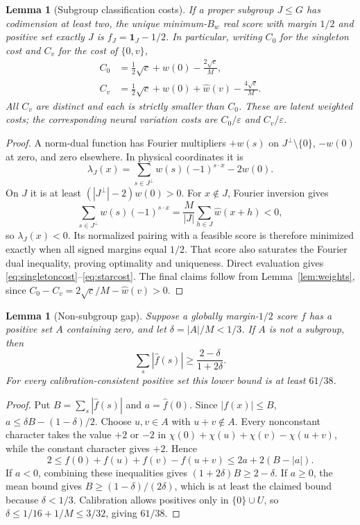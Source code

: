 \documentclass[11pt]{article}
\newtheorem{lemma}[theorem]{Lemma}
\newcommand{\one}{\mathbf 1}
\newcommand{\eps}{\varepsilon}
\begin{document}
\begin{lemma}[Subgroup classification costs]\label{lem:subgroup}
If a proper subgroup $J\le G$ has codimension at least two, the unique
minimum-$B_w$ real score with margin $1/2$ and positive set exactly $J$
is $f_J=\one_J-1/2$. In particular, writing $C_0$ for the singleton
cost and $C_v$ for the cost of $\{0,v\}$,
\begin{align}
 C_0&=\frac12\sqrt c+\widehat w(0)-\frac{2\sqrt c}M,\label{eq:singletoncost}\\
 C_v&=\frac12\sqrt c+\widehat w(0)+\widehat w(v)-\frac{4\sqrt c}M.
 \label{eq:starcost}
\end{align}
All $C_v$ are distinct and each is strictly smaller than $C_0$.
These are latent weighted costs; the corresponding neural variation
costs are $C_0/\eps$ and $C_v/\eps$.
\end{lemma}
\begin{proof}
A norm-dual function has Fourier multipliers $+w(s)$ on
$J^\perp\setminus\{0\}$, $-w(0)$ at zero, and zero elsewhere. In
physical coordinates it is
\[
 \lambda_J(x)=\sum_{s\in J^\perp}w(s)(-1)^{s\cdot x}-2w(0).
\]
On $J$ it is at least $(|J^\perp|-2)w(0)>0$. For $x\notin J$,
Fourier inversion gives
\[
 \sum_{s\in J^\perp}w(s)(-1)^{s\cdot x}
   =\frac M{|J|}\sum_{h\in J}\widehat w(x+h)<0,
\]
so $\lambda_J(x)<0$. Its normalized pairing with a feasible score is
therefore minimized exactly when all signed margins equal $1/2$.
That score also saturates the Fourier dual inequality, proving
optimality and uniqueness. Direct evaluation gives
\eqref{eq:singletoncost}--\eqref{eq:starcost}. The final claims follow
from Lemma~\ref{lem:weights}, since
$C_0-C_v=2\sqrt c/M-\widehat w(v)>0$.
\end{proof}

\begin{lemma}[Non-subgroup gap]\label{lem:nonsubgroup}
Suppose a globally margin-$1/2$ score $f$ has a positive set $A$
containing zero, and let $\delta=|A|/M<1/3$. If $A$ is not a subgroup,
then
\[
 \sum_s|\widehat f(s)|\ge\frac{2-\delta}{1+2\delta}.
\]
For every calibration-consistent positive set this lower bound is at
least $61/38$.
\end{lemma}
\begin{proof}
Put $B=\sum_s|\widehat f(s)|$ and $a=\widehat f(0)$. Since
$|f(x)|\le B$,
$a\le\delta B-(1-\delta)/2$. Choose $u,v\in A$ with $u+v\notin A$.
Every nonconstant character takes the value $+2$ or $-2$ in
$\chi(0)+\chi(u)+\chi(v)-\chi(u+v)$, while the constant character
gives $+2$. Hence
\[
 2\le f(0)+f(u)+f(v)-f(u+v)
   \le2a+2(B-|a|).
\]
If $a<0$, combining these inequalities gives
$(1+2\delta)B\ge2-\delta$. If $a\ge0$, the mean bound gives
$B\ge(1-\delta)/(2\delta)$, which is at least the claimed bound
because $\delta<1/3$. Calibration allows positives only in
$\{0\}\cup U$, so $\delta\le1/16+1/M\le3/32$, giving $61/38$.
\end{proof}
\end{document}
